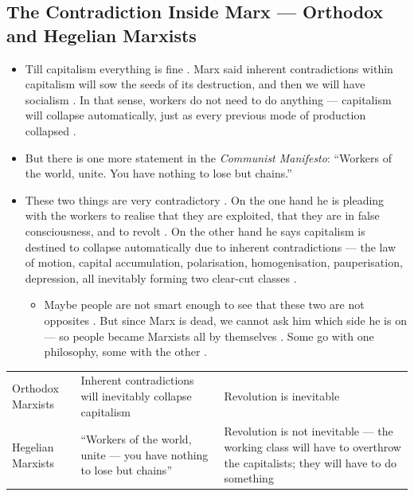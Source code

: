 \subsection{The Contradiction Inside Marx --- Orthodox and Hegelian Marxists}
\begin{itemize}
    \item Till capitalism everything is fine . Marx said inherent contradictions within capitalism will sow the seeds of its destruction, and then we will have socialism . In that sense, workers do not need to do anything --- capitalism will collapse automatically, just as every previous mode of production collapsed .
    \item But there is one more statement in the \emph{Communist Manifesto}: ``Workers of the world, unite. You have nothing to lose but chains.'' 
    \item These two things are very contradictory . On the one hand he is pleading with the workers to realise that they are exploited, that they are in false consciousness, and to revolt . On the other hand he says capitalism is destined to collapse automatically due to inherent contradictions --- the law of motion, capital accumulation, polarisation, homogenisation, pauperisation, depression, all inevitably forming two clear-cut classes .
    \begin{itemize}
        \item Maybe people are not smart enough to see that these two are not opposites . But since Marx is dead, we cannot ask him which side he is on --- so people became Marxists all by themselves . Some go with one philosophy, some with the other .
    \end{itemize}
\end{itemize}

\begin{table}[h!]
\centering
\begin{tabularx}{\textwidth}{lYY}
\toprule
{}
 &  &  \\
\midrule
Orthodox Marxists & Inherent contradictions will inevitably collapse capitalism & Revolution is inevitable \\
Hegelian Marxists & ``Workers of the world, unite --- you have nothing to lose but chains'' & Revolution is not inevitable --- the working class will have to overthrow the capitalists; they will have to do something \\
\bottomrule
\end{tabularx}
\end{table}

